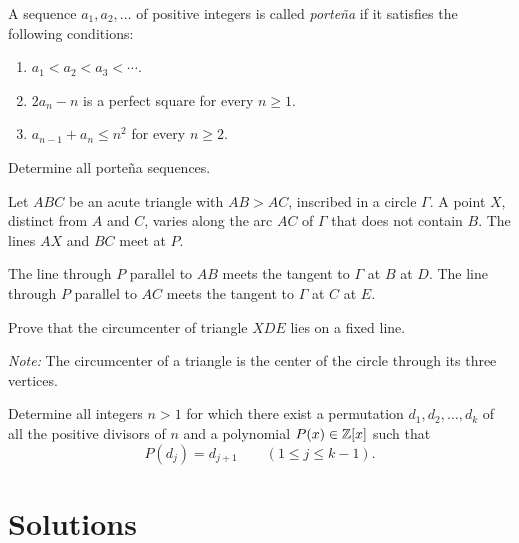 \documentclass[12pt]{memoir}
\newif\ifpracticesolutions
\begin{document}
\begin{Ej}
A sequence \(a_1,a_2,\ldots\) of positive integers is called
\emph{porte\~na} if it satisfies the following conditions:
\begin{enumerate}[label=(\roman*)]
    \item \(a_1<a_2<a_3<\cdots\).
    \item \(2a_n-n\) is a perfect square for every \(n\geq1\).
    \item \(a_{n-1}+a_n\leq n^2\) for every \(n\geq2\).
\end{enumerate}
Determine all porte\~na sequences.
\end{Ej}

\begin{Ej}
Let \(ABC\) be an acute triangle with \(AB>AC\), inscribed in a circle
\(\Gamma\). A point \(X\), distinct from \(A\) and \(C\), varies along
the arc \(AC\) of \(\Gamma\) that does not contain \(B\).
The lines \(AX\) and \(BC\) meet at \(P\).

The line through \(P\) parallel to \(AB\) meets the tangent to
\(\Gamma\) at \(B\) at \(D\). The line through \(P\) parallel to
\(AC\) meets the tangent to \(\Gamma\) at \(C\) at \(E\).

Prove that the circumcenter of triangle \(XDE\) lies on a fixed line.

\emph{Note:} The circumcenter of a triangle is the center of the circle
through its three vertices.
\end{Ej}

\begin{Ej}
Determine all integers \(n>1\) for which there exist a permutation
\(d_1,d_2,\ldots,d_k\) of all the positive divisors of \(n\) and a
polynomial \(P(x)\in\mathbb{Z}[x]\) such that
\[
    P(d_j)=d_{j+1}\qquad(1\leq j\leq k-1).
\]
\end{Ej}

\ifpracticesolutions
\newpage
\section*{Solutions}
\setcounter{Ej}{0}
\renewcommand{\theHEj}{solution.\arabic{Ej}}
\end{document}
